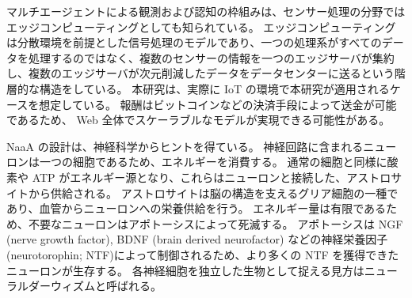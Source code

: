 マルチエージェントによる観測および認知の枠組みは、センサー処理の分野ではエッジコンピューティング\citep{bonomi2012fog}としても知られている。
エッジコンピューティングは分散環境を前提とした信号処理のモデルであり、一つの処理系がすべてのデータを処理するのではなく、複数のセンサーの情報を一つのエッジサーバが集約し、複数のエッジサーバが次元削減したデータをデータセンターに送るという階層的な構造をしている。
本研究は、実際に IoT の環境で本研究が適用されるケースを想定している。
報酬はビットコインなどの決済手段によって送金が可能であるため、
Web 全体でスケーラブルなモデルが実現できる可能性がある。

NaaA の設計は、神経科学からヒントを得ている。
神経回路に含まれるニューロンは一つの細胞であるため、エネルギーを消費する。
通常の細胞と同様に酸素や ATP がエネルギー源となり、これらはニューロンと接続した、アストロサイトから供給される。
アストロサイトは脳の構造を支えるグリア細胞の一種であり、血管からニューロンへの栄養供給を行う。
エネルギー量は有限であるため、不要なニューロンはアポトーシスによって死滅する。
アポトーシスは NGF (nerve growth factor), BDNF (brain derived neurofactor) などの神経栄養因子(neurotorophin; NTF)によって制御されるため、より多くの NTF を獲得できたニューロンが生存する。
各神経細胞を独立した生物として捉える見方はニューラルダーウィズム\citep{edelman1987neural}と呼ばれる。
\fi
